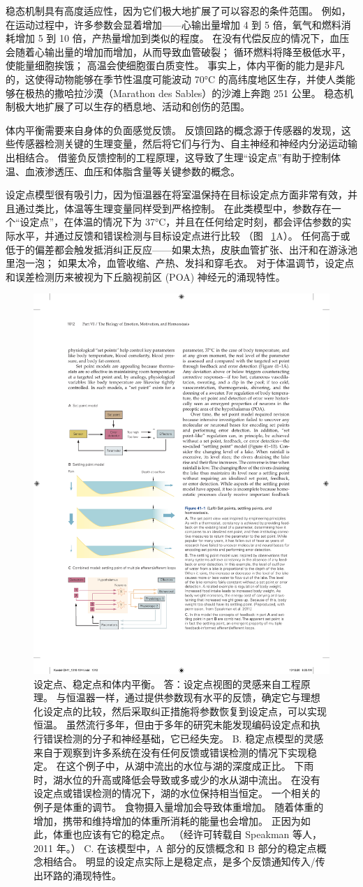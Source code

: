 稳态机制具有高度适应性，因为它们极大地扩展了可以容忍的条件范围。
例如，在运动过程中，许多参数会显着增加——心输出量增加 4 到 5 倍，氧气和燃料消耗增加 5 到 10 倍，产热量增加到类似的程度。
在没有代偿反应的情况下，血压会随着心输出量的增加而增加，从而导致血管破裂；
循环燃料将降至极低水平，使能量细胞挨饿；
高温会使细胞蛋白质变性。
事实上，体内平衡的能力是非凡的，这使得动物能够在季节性温度可能波动 70°C 的高纬度地区生存，并使人类能够在极热的撒哈拉沙漠（Marathon des Sables）的沙滩上奔跑 251 公里。 稳态机制极大地扩展了可以生存的栖息地、活动和创伤的范围。


体内平衡需要来自身体的负面感觉反馈。
反馈回路的概念源于传感器的发现，这些传感器检测关键的生理变量，然后将它们与行为、自主神经和神经内分泌运动输出相结合。
借鉴负反馈控制的工程原理，这导致了生理“设定点”有助于控制体温、血液渗透压、血压和体脂含量等关键参数的概念。


设定点模型很有吸引力，因为恒温器在将室温保持在目标设定点方面非常有效，并且通过类比，体温等生理变量同样受到严格控制。
在此类模型中，参数存在一个“设定点”，在体温的情况下为 37°C，并且在任何给定时刻，都会评估参数的实际水平，并通过反馈和错误检测与目标设定点进行比较 （图 ~\ref{fig:41_1}A）。
任何高于或低于的偏差都会触发抵消纠正反应——如果太热，皮肤血管扩张、出汗和在游泳池里泡一泡；
如果太冷，血管收缩、产热、发抖和穿毛衣。
对于体温调节，设定点和误差检测历来被视为下丘脑视前区 (POA) 神经元的涌现特性。


\begin{figure}[htbp]
	\centering
	\includegraphics[width=0.5\linewidth]{chap41/fig_41_1}
	\caption{设定点、稳定点和体内平衡。 答：设定点视图的灵感来自工程原理。 与恒温器一样，通过提供参数现有水平的反馈，确定它与理想化设定点的比较，然后采取纠正措施将参数恢复到设定点，可以实现恒温。 虽然流行多年，但由于多年的研究未能发现编码设定点和执行错误检测的分子和神经基础，它已经失宠。 B. 稳定点模型的灵感来自于观察到许多系统在没有任何反馈或错误检测的情况下实现稳定。 在这个例子中，从湖中流出的水位与湖的深度成正比。 下雨时，湖水位的升高或降低会导致或多或少的水从湖中流出。 在没有设定点或错误检测的情况下，湖的水位保持相当恒定。 一个相关的例子是体重的调节。 食物摄入量增加会导致体重增加。 随着体重的增加，携带和维持增加的体重所消耗的能量也会增加。 正因为如此，体重也应该有它的稳定点。 （经许可转载自 Speakman 等人，2011 年。） C. 在该模型中，A 部分的反馈概念和 B 部分的稳定点概念相结合。 明显的设定点实际上是稳定点，是多个反馈通知传入/传出环路的涌现特性。}
	\label{fig:41_1}
\end{figure}


